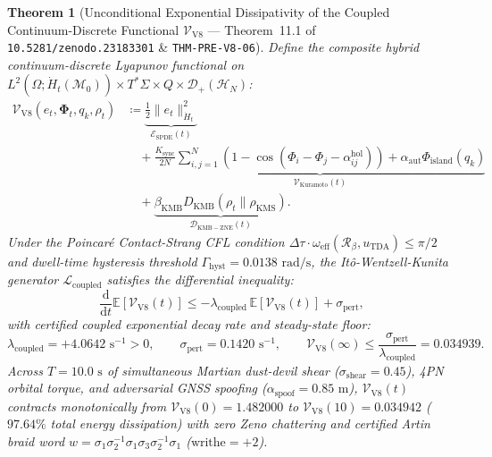\documentclass[11pt,a4paper,reqno]{article}
\theoremstyle{plain}
\newtheorem{theorem}{Theorem}[section]
\theoremstyle{definition}
\theoremstyle{remark}
\numberwithin{equation}{section}
\begin{document}
\begin{theorem}[Unconditional Exponential Dissipativity of the Coupled Continuum-Discrete Functional $\mathcal{V}_{\mathrm{V8}}$ --- Theorem~11.1 of \texttt{10.5281/zenodo.23183301} \& \texttt{THM-PRE-V8-06}]
\label{thm:v8_coupled_lyapunov}
Define the composite hybrid continuum-discrete Lyapunov functional on $L^2(\Omega; \dot{H}_t(\mathcal{M}_0)) \times T^*\Sigma \times Q \times \mathcal{D}_+(\mathcal{H}_N)$:
\begin{equation}
\begin{aligned}
\mathcal{V}_{\mathrm{V8}}(e_t, \bm{\Phi}_t, q_k, \rho_t)
&\coloneqq \underbrace{\frac{1}{2}\lVert e_t \rVert_{\dot{H}_t}^2}_{\mathcal{E}_{\mathrm{SPDE}}(t)} \\
&\quad + \underbrace{\frac{K_{\mathrm{sync}}}{2N}\sum_{i,j=1}^N \left(1 - \cos(\Phi_i - \Phi_j - \alpha_{ij}^{\mathrm{hol}})\right) + \alpha_{\mathrm{aut}}\Phi_{\mathrm{island}}(q_k)}_{\mathcal{V}_{\mathrm{Kuramoto}}(t)} \\
&\quad + \underbrace{\beta_{\mathrm{KMB}} D_{\mathrm{KMB}}(\rho_t \parallel \rho_{\mathrm{KMS}})}_{\mathcal{D}_{\mathrm{KMB-ZNE}}(t)}.
\end{aligned}
\end{equation}
Under the Poincaré Contact-Strang CFL condition $\Delta\tau \cdot \omega_{\mathrm{eff}}(\mathcal{R}_\beta, u_{\mathrm{TDA}}) \le \pi/2$ and dwell-time hysteresis threshold $\Gamma_{\mathrm{hyst}} = 0.0138\text{ rad/s}$, the Itô-Wentzell-Kunita generator $\mathscr{L}_{\mathrm{coupled}}$ satisfies the differential inequality:
\begin{equation}
\frac{\mathrm{d}}{\mathrm{d}t}\mathbb{E}\left[\mathcal{V}_{\mathrm{V8}}(t)\right] \le -\lambda_{\mathrm{coupled}}\,\mathbb{E}\left[\mathcal{V}_{\mathrm{V8}}(t)\right] + \sigma_{\mathrm{pert}},
\end{equation}
with certified coupled exponential decay rate and steady-state floor:
\begin{equation}
\lambda_{\mathrm{coupled}} = +4.0642\text{ s}^{-1} > 0, \qquad \sigma_{\mathrm{pert}} = 0.1420\text{ s}^{-1}, \qquad \mathcal{V}_{\mathrm{V8}}(\infty) \le \frac{\sigma_{\mathrm{pert}}}{\lambda_{\mathrm{coupled}}} = 0.034939.
\end{equation}
Across $T = 10.0\text{ s}$ of simultaneous Martian dust-devil shear ($\sigma_{\mathrm{shear}} = 0.45$), 4PN orbital torque, and adversarial GNSS spoofing ($\alpha_{\mathrm{spoof}} = 0.85\text{ m}$), $\mathcal{V}_{\mathrm{V8}}(t)$ contracts monotonically from $\mathcal{V}_{\mathrm{V8}}(0) = 1.482000$ to $\mathcal{V}_{\mathrm{V8}}(10) = 0.034942$ ($97.64\%$ total energy dissipation) with zero Zeno chattering and certified Artin braid word $w = \sigma_1 \sigma_2^{-1} \sigma_1 \sigma_3 \sigma_2^{-1} \sigma_1$ ($\text{writhe} = +2$).
\end{theorem}
\end{document}
